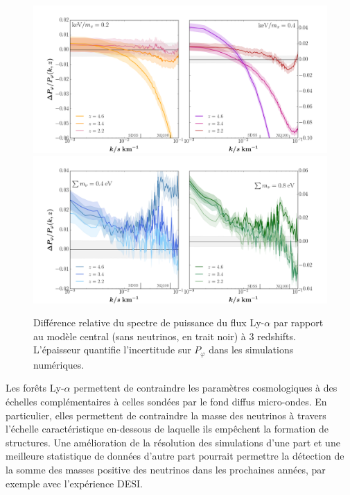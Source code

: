 \begin{figure}
\begin{center}
\includegraphics[width=0.75\columnwidth]{Figures/WDM/Mx_Pf.png}
\includegraphics[width=0.75\columnwidth]{Figures/Mnu/Mnu_Pf.png}
\caption{Différence relative du spectre de puissance du flux Ly-$\alpha$ par rapport au modèle central (sans neutrinos, en trait noir) à 3 redshifts. L'épaisseur quantifie l'incertitude sur $P_\varphi$ dans les simulations numériques.}
\label{fig:pf}
\end{center}
\end{figure}

Les forêts Ly-$\alpha$ permettent de contraindre les paramètres cosmologiques à des échelles complémentaires à celles sondées par le fond diffus micro-ondes. En particulier, elles permettent de contraindre la masse des neutrinos à travers l'échelle caractéristique en-dessous de laquelle ils empêchent la formation de structures. Une amélioration de la résolution des simulations d'une part et une meilleure statistique de données d'autre part pourrait permettre la détection de la somme des masses positive des neutrinos dans les prochaines années, par exemple avec l'expérience DESI.